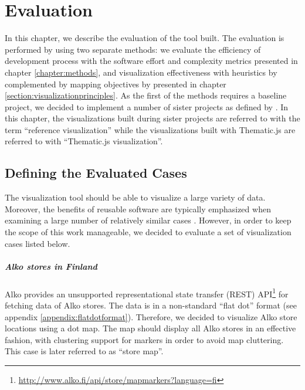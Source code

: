 
\chapter{Evaluation}
\label{chapter:evaluation}

In this chapter, we describe the evaluation of the tool built. The evaluation is performed by using two separate methods: we evaluate the efficiency of development process with the software effort and complexity metrics presented in chapter \ref{chapter:methods}, and visualization effectiveness with heuristics by \citet{zuk_heuristics_2006} complemented by mapping objectives by \citet{schlichtmann_visualization_2002} presented in chapter \ref{section:visualizationprinciples}. As the first of the methods requires a baseline project, we decided to implement a number of sister projects as defined by \citet{kitchenham_evaluating_1998}. In this chapter, the visualizations built during sister projects are referred to with the term ``reference visualization'' while the visualizations built with Thematic.js are referred to with ``Thematic.js visualization''.

\section{Defining the Evaluated Cases}
\label{section:evaluatedcases}

The visualization tool should be able to visualize a large variety of data. Moreover, the benefits of reusable software are typically emphasized when examining a large number of relatively similar cases \citep{frakes_software_1996}. However, in order to keep the scope of this work manageable, we decided to evaluate a set of visualization cases listed below.

\paragraph{Alko stores in Finland}
Alko provides an unsupported representational state transfer (REST) API\footnote{\url{http://www.alko.fi/api/store/mapmarkers?language=fi}} for fetching data of Alko stores. The data is in a non-standard ``flat dot'' format (see appendix \ref{appendix:flatdotformat}). Therefore, we decided to visualize Alko store locations using a dot map. The map should display all Alko stores in an effective fashion, with clustering support for markers in order to avoid map cluttering. This case is later referred to as ``store map''.

